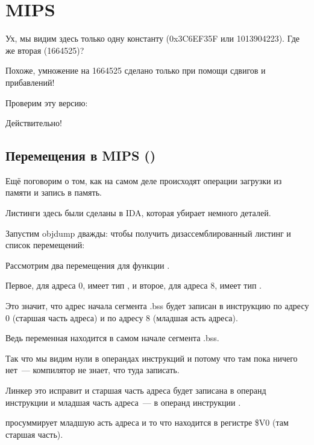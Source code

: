 \section{MIPS}



Ух, мы видим здесь только одну константу (0x3C6EF35F или 1013904223).
Где же вторая (1664525)?

Похоже, умножение на 1664525 сделано только при помощи сдвигов и прибавлений!

Проверим эту версию:





Действительно!

\subsection{Перемещения в MIPS ()}

Ещё поговорим о том, как на самом деле происходят операции загрузки из памяти и запись в память.

Листинги здесь были сделаны в IDA, которая убирает немного деталей.

Запустим objdump дважды: чтобы получить дизассемблированный листинг и список перемещений:



Рассмотрим два перемещения для функции .

Первое, для адреса 0, имеет тип , и второе, для адреса 8, имеет тип .

Это значит, что адрес начала сегмента .bss будет записан в инструкцию по адресу 0 (старшая часть адреса)
и по адресу 8 (младшая асть адреса).

Ведь переменная  находится в самом начале сегмента .bss.

Так что мы видим нули в операндах инструкций \LUI и \SW потому что там пока ничего нет~--- 
компилятор не знает, что туда записать.

Линкер это исправит и старшая часть адреса будет записана в операнд инструкции \LUI и младшая часть адреса~---
в операнд инструкции \SW.

\SW просуммирует младшую асть адреса и то что находится в регистре \$V0 (там старшая часть).

